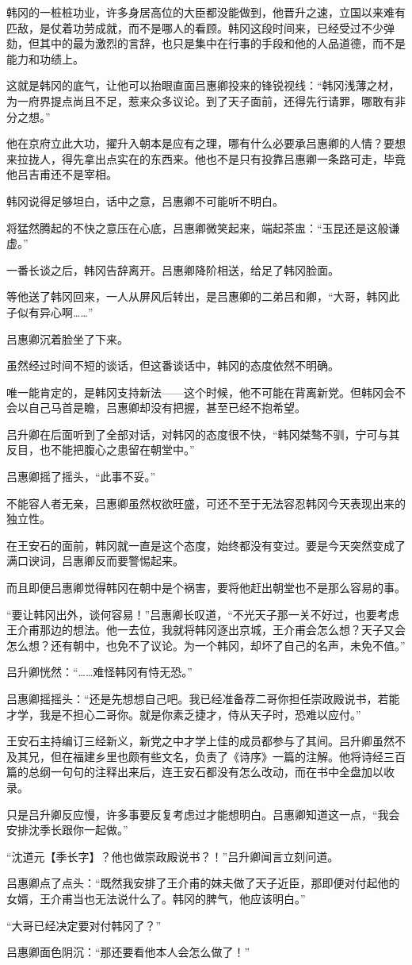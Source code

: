 韩冈的一桩桩功业，许多身居高位的大臣都没能做到，他晋升之速，立国以来难有匹敌，是仗着功劳成就，而不是哪人的看顾。韩冈这段时间来，已经受过不少弹劾，但其中的最为激烈的言辞，也只是集中在行事的手段和他的人品道德，而不是能力和功绩上。

这就是韩冈的底气，让他可以抬眼直面吕惠卿投来的锋锐视线：“韩冈浅薄之材，为一府界提点尚且不足，惹来众多议论。到了天子面前，还得先行请罪，哪敢有非分之想。”

他在京府立此大功，擢升入朝本是应有之理，哪有什么必要承吕惠卿的人情？要想来拉拢人，得先拿出点实在的东西来。他也不是只有投靠吕惠卿一条路可走，毕竟他吕吉甫还不是宰相。

韩冈说得足够坦白，话中之意，吕惠卿不可能听不明白。

将猛然腾起的不快之意压在心底，吕惠卿微笑起来，端起茶盅：“玉昆还是这般谦虚。”

一番长谈之后，韩冈告辞离开。吕惠卿降阶相送，给足了韩冈脸面。

等他送了韩冈回来，一人从屏风后转出，是吕惠卿的二弟吕和卿，“大哥，韩冈此子似有异心啊……”

吕惠卿沉着脸坐了下来。

虽然经过时间不短的谈话，但这番谈话中，韩冈的态度依然不明确。

唯一能肯定的，是韩冈支持新法——这个时候，他不可能在背离新党。但韩冈会不会以自己马首是瞻，吕惠卿却没有把握，甚至已经不抱希望。

吕升卿在后面听到了全部对话，对韩冈的态度很不快，“韩冈桀骜不驯，宁可与其反目，也不能把腹心之患留在朝堂中。”

吕惠卿摇了摇头，“此事不妥。”

不能容人者无亲，吕惠卿虽然权欲旺盛，可还不至于无法容忍韩冈今天表现出来的独立性。

在王安石的面前，韩冈就一直是这个态度，始终都没有变过。要是今天突然变成了满口谀词，吕惠卿反而要警惕起来。

而且即便吕惠卿觉得韩冈在朝中是个祸害，要将他赶出朝堂也不是那么容易的事。

“要让韩冈出外，谈何容易！”吕惠卿长叹道，“不光天子那一关不好过，也要考虑王介甫那边的想法。他一去位，我就将韩冈逐出京城，王介甫会怎么想？天子又会怎么想？还有朝中，也免不了议论。为一个韩冈，却坏了自己的名声，未免不值。”

吕升卿恍然：“……难怪韩冈有恃无恐。”

吕惠卿摇摇头：“还是先想想自己吧。我已经准备荐二哥你担任崇政殿说书，若能才学，我是不担心二哥你。就是你素乏捷才，侍从天子时，恐难以应付。”

王安石主持编订三经新义，新党之中才学上佳的成员都参与了其间。吕升卿虽然不及其兄，但在福建乡里也颇有些文名，负责了《诗序》一篇的注解。他将诗经三百篇的总纲一句句的注释出来后，连王安石都没有怎么改动，而在书中全盘加以收录。

只是吕升卿反应慢，许多事要反复考虑过才能想明白。吕惠卿知道这一点，“我会安排沈季长跟你一起做。”

“沈道元【季长字】？他也做崇政殿说书？！”吕升卿闻言立刻问道。

吕惠卿点了点头：“既然我安排了王介甫的妹夫做了天子近臣，那即便对付起他的女婿，王介甫当也无法说什么了。韩冈的脾气，他应该明白。”

“大哥已经决定要对付韩冈了？”

吕惠卿面色阴沉：“那还要看他本人会怎么做了！”

